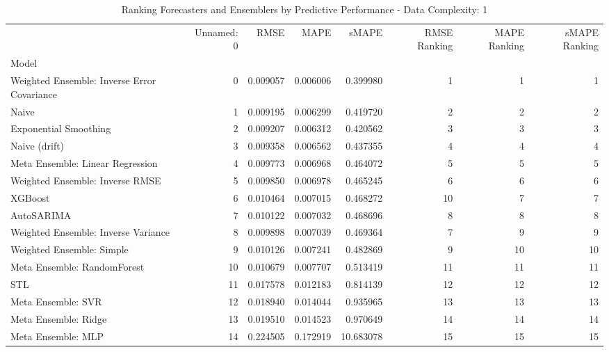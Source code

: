 \begin{table}
\caption{Ranking Forecasters and Ensemblers by Predictive Performance - Data Complexity: 1}
\begin{tabular}{lrrrrrrr}
\toprule
 & Unnamed: 0 & RMSE & MAPE & sMAPE & RMSE Ranking & MAPE Ranking & sMAPE Ranking \\
Model &  &  &  &  &  &  &  \\
\midrule
Weighted Ensemble: Inverse Error Covariance & 0 & 0.009057 & 0.006006 & 0.399980 & 1 & 1 & 1 \\
Naive & 1 & 0.009195 & 0.006299 & 0.419720 & 2 & 2 & 2 \\
Exponential Smoothing & 2 & 0.009207 & 0.006312 & 0.420562 & 3 & 3 & 3 \\
Naive (drift) & 3 & 0.009358 & 0.006562 & 0.437355 & 4 & 4 & 4 \\
Meta Ensemble: Linear Regression & 4 & 0.009773 & 0.006968 & 0.464072 & 5 & 5 & 5 \\
Weighted Ensemble: Inverse RMSE & 5 & 0.009850 & 0.006978 & 0.465245 & 6 & 6 & 6 \\
XGBoost & 6 & 0.010464 & 0.007015 & 0.468272 & 10 & 7 & 7 \\
AutoSARIMA & 7 & 0.010122 & 0.007032 & 0.468696 & 8 & 8 & 8 \\
Weighted Ensemble: Inverse Variance & 8 & 0.009898 & 0.007039 & 0.469364 & 7 & 9 & 9 \\
Weighted Ensemble: Simple & 9 & 0.010126 & 0.007241 & 0.482869 & 9 & 10 & 10 \\
Meta Ensemble: RandomForest & 10 & 0.010679 & 0.007707 & 0.513419 & 11 & 11 & 11 \\
STL & 11 & 0.017578 & 0.012183 & 0.814139 & 12 & 12 & 12 \\
Meta Ensemble: SVR & 12 & 0.018940 & 0.014044 & 0.935965 & 13 & 13 & 13 \\
Meta Ensemble: Ridge & 13 & 0.019510 & 0.014523 & 0.970649 & 14 & 14 & 14 \\
Meta Ensemble: MLP & 14 & 0.224505 & 0.172919 & 10.683078 & 15 & 15 & 15 \\
\bottomrule
\end{tabular}
\end{table}
